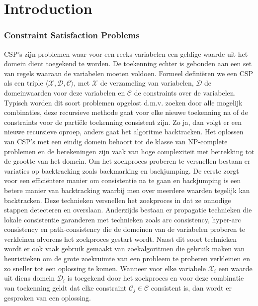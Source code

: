 \chapter{Introduction}
\label{cha:intro}

\subsection{Constraint Satisfaction Problems}
CSP's zijn problemen waar voor een reeks variabelen een geldige waarde uit het domein dient toegekend te worden. De toekenning echter is gebonden aan een set van regels waaraan de variabelen moeten voldoen. Formeel defini\"{e}ren we een CSP als een triple $\langle \mathcal{X},\mathcal{D},\mathcal{C} \rangle$, met $\mathcal{X}$ de verzameling van variabelen, $\mathcal{D}$ de domeinwaarden voor deze variabelen en $\mathcal{C}$ de constraints over de variabelen. Typisch worden dit soort problemen opgelost d.m.v. zoeken door alle mogelijk combinaties, deze recursieve methode gaat voor elke nieuwe toekenning na of de constraints voor de parti\"{e}le toekenning consistent zijn. Zo ja, dan volgt er een nieuwe recursieve oproep, anders gaat het algoritme backtracken. Het oplossen van CSP's met een eindig domein behoort tot de klasse van NP-complete problemen en de berekeningen zijn vaak van hoge complexiteit met betrekking tot de grootte van het domein. Om het zoekproces proberen te versnellen bestaan er variaties op backtracking zoals backmarking en backjumping. De eerste zorgt voor een effici\"{e}ntere manier om consistentie na te gaan en backjumping is een betere manier van backtracking waarbij men over meerdere waarden tegelijk kan backtracken. Deze technieken versnellen het zoekproces in dat ze onnodige stappen detecteren en overslaan. Anderzijds bestaan er propagatie technieken die lokale consistentie garanderen met technieken zoals arc consistency, hyper-arc consistency en path-consistency die de domeinen van de variabelen proberen te verkleinen alvorens het zoekproces gestart wordt. Naast dit soort technieken wordt er ook vaak gebruik gemaakt van zoekalgoritmen die gebruik maken van heuristieken om de grote zoekruimte van een probleem te proberen verkleinen en zo sneller tot een oplossing te komen. Wanneer voor elke variabele $\mathcal{X}_{i}$ een waarde uit diens domein $\mathcal{D}_{i}$ is toegekend door het zoekproces en voor deze combinatie van toekenning geldt dat elke constraint $\mathcal{C}_{j} \in \mathcal{C}$ consistent is, dan wordt er gesproken van een oplossing. 



